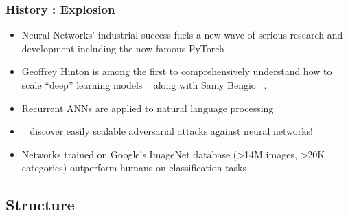 \begin{frame}
  \frametitle{History : Explosion}
  \begin{itemize}
     \item<1-> Neural Networks' industrial success fuels a new wave of
       serious research and development including the now famous
       PyTorch ~\citep{Collobert2002TorchAM} 
       
     \item<2-> Geoffrey Hinton is among the first to comprehensively understand
       how to scale ``deep'' learning models
       ~\citep{hinton2006reducing, hinton2006fast} along with Samy
       Bengio ~\citep{bengio2009learning}. 


       \item<3-> Recurrent ANNs are applied to natural
language processing ~\citep{collobert2011natural}
       \item<4-> ~\citet{szegedy2013} discover easily scalable
         adversarial attacks against neural networks!

      \item<5-> Networks trained on Google's ImageNet database (>14M
        images, >20K categories) outperform humans on classification
        tasks \citep{SCHMIDHUBER201585}
  \end{itemize}
\end{frame}


\subsection{Structure}


